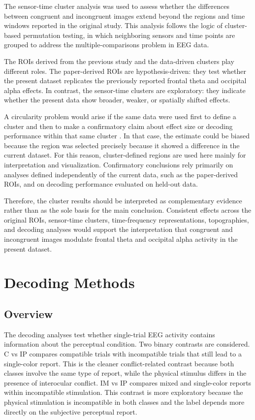 \documentclass[11pt,a4paper,chapterprefix=false,parskip=false]{scrreprt}
\begin{document}
The sensor-time cluster analysis was used to assess whether the differences between congruent and incongruent images extend beyond the regions and time windows reported in the original study. This analysis follows the logic of cluster-based permutation testing, in which neighboring sensors and time points are grouped to address the multiple-comparisons problem in EEG data.

The ROIs derived from the previous study and the data-driven clusters play different roles. The paper-derived ROIs are hypothesis-driven: they test whether the present dataset replicates the previously reported frontal theta and occipital alpha effects. In contrast, the sensor-time clusters are exploratory: they indicate whether the present data show broader, weaker, or spatially shifted effects.

A circularity problem would arise if the same data were used first to define a cluster and then to make a confirmatory claim about effect size or decoding performance within that same cluster \citep{kriegeskorte_circular_2009}. In that case, the estimate could be biased because the region was selected precisely because it showed a difference in the current dataset. For this reason, cluster-defined regions are used here mainly for interpretation and visualization. Confirmatory conclusions rely primarily on analyses defined independently of the current data, such as the paper-derived ROIs, and on decoding performance evaluated on held-out data.

Therefore, the cluster results should be interpreted as complementary evidence rather than as the sole basis for the main conclusion. Consistent effects across the original ROIs, sensor-time clusters, time-frequency representations, topographies, and decoding analyses would support the interpretation that congruent and incongruent images modulate frontal theta and occipital alpha activity in the present dataset.

\chapter{Decoding Methods}
\label{chap:methods}

\section{Overview}
The decoding analyses test whether single-trial EEG activity contains information about the perceptual condition. Two binary contrasts are considered. C vs IP compares compatible trials with incompatible trials that still lead to a single-color report. This is the cleaner conflict-related contrast because both classes involve the same type of report, while the physical stimulus differs in the presence of interocular conflict. IM vs IP compares mixed and single-color reports within incompatible stimulation. This contrast is more exploratory because the physical stimulation is incompatible in both classes and the label depends more directly on the subjective perceptual report.
\end{document}
